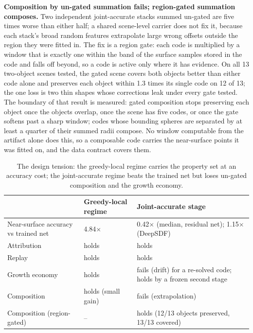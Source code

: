 \documentclass[11pt]{article}
\begin{document}
\textbf{Composition by un-gated summation fails; region-gated
summation composes.} Two independent joint-accurate stacks summed un-gated are
five times worse than either half; a shared scene-level carrier
does not fix it, because each stack's broad random features
extrapolate large wrong offsets outside the region they were fitted
in. The fix is a region gate: each code is multiplied by a
window that is exactly one within the band of the surface samples
stored in the code and falls off beyond, so a code is active only
where it has evidence. On all 13 two-object scenes tested, the
gated scene covers both objects better than either code alone and
preserves each object within 1.3 times its single code on 12 of
13; the one loss is two thin shapes whose corrections leak under
every gate tested. The boundary of that result is measured: gated
composition stops preserving each object once the objects overlap,
once the scene has five codes, or once the gate softens past a
sharp window; codes whose bounding spheres are separated by at
least a quarter of their summed radii compose. No window computable
from the artifact alone does this, so a composable code carries the
near-surface points it was fitted on, and the data contract covers
them.

\begin{table}[t]
\centering
\small
\begin{tabular}{lp{4.1cm}p{4.1cm}}
\toprule
 & Greedy-local regime & Joint-accurate stage \\
\midrule
Near-surface accuracy vs trained net & 4.84$\times$ & 0.42$\times$ (median, residual net); 1.15$\times$ (DeepSDF) \\
Attribution & holds & holds \\
Replay & holds & holds \\
Growth economy & holds & fails (drift) for a re-solved code; holds by a frozen second stage \\
Composition & holds (small gain) & fails (extrapolation) \\
Composition (region-gated) & -- & holds (12/13 objects preserved, 13/13 covered) \\
\bottomrule
\end{tabular}
\caption{The design tension: the greedy-local regime carries the
property set at an accuracy cost; the joint-accurate regime beats
the trained net but loses un-gated composition and the growth
economy.}
\label{tab:tension}
\end{table}

\end{document}
